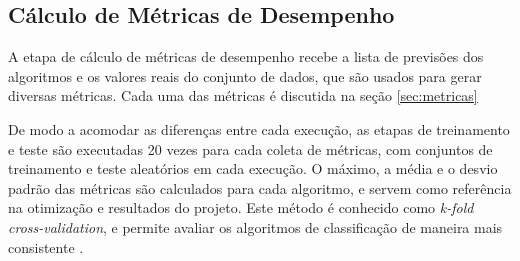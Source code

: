 \subsection{Cálculo de Métricas de Desempenho}
\label{subsec:calculo-metricas}

A etapa de cálculo de métricas de desempenho recebe a lista de previsões dos algoritmos e os valores reais do conjunto de dados, que são usados para gerar diversas métricas. Cada uma das métricas é discutida na seção \ref{sec:metricas}

De modo a acomodar as diferenças entre cada execução, as etapas de treinamento e teste são executadas 20 vezes para cada coleta de métricas, com conjuntos de treinamento e teste aleatórios em cada execução. O máximo, a média e o desvio padrão das métricas são calculados para cada algoritmo, e servem como referência na otimização e resultados do projeto. Este método é conhecido como \textit{k-fold cross-validation}, e permite avaliar os algoritmos de classificação de maneira mais consistente \cite{kfold}.




